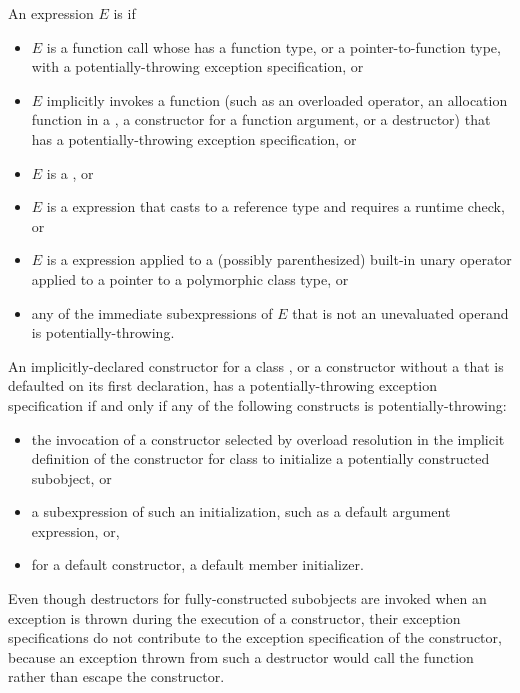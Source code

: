\pnum
An expression $E$ is
 if
\begin{itemize}
\item
$E$ is a function call
whose 
has a function type,
or a pointer-to-function type,
with a potentially-throwing exception specification,
or
\item
$E$ implicitly invokes a function
(such as an overloaded operator,
an allocation function in a ,
a constructor for a function argument,
or a destructor)
that has a potentially-throwing exception specification,
or
\item
$E$ is a ,
or
\item
$E$ is a  expression that casts to a reference type and
requires a runtime check,
or
\item
$E$ is a  expression applied to a
(possibly parenthesized) built-in unary \tcode{*} operator
applied to a pointer to a
polymorphic class type,
or
\item
any of the immediate subexpressions
of $E$ that is not an unevaluated operand is potentially-throwing.
\end{itemize}

\pnum
An implicitly-declared constructor for a class ,
or a constructor without a 
that is defaulted on its first declaration,
has a potentially-throwing exception specification
if and only if
any of the following constructs is potentially-throwing:
\begin{itemize}
\item
the invocation of a constructor selected by overload resolution
in the implicit definition of the constructor
for class 
to initialize a potentially constructed subobject, or
\item
a subexpression of such an initialization,
such as a default argument expression, or,
\item
for a default constructor, a default member initializer.
\end{itemize}
\begin{note}
Even though destructors for fully-constructed subobjects
are invoked when an exception is thrown
during the execution of a constructor,
their exception specifications do not contribute
to the exception specification of the constructor,
because an exception thrown from such a destructor
would call the function 
rather than escape the constructor.
\end{note}

